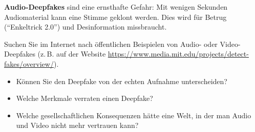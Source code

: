 \begin{myremark}
\textbf{Audio-Deepfakes} sind eine ernsthafte Gefahr: Mit wenigen Sekunden
Audiomaterial kann eine Stimme geklont werden. Dies wird für Betrug
(\enquote{Enkeltrick 2.0}) und Desinformation missbraucht.
\end{myremark}

\begin{myexercise}
Suchen Sie im Internet nach öffentlichen Beispielen von Audio- oder Video-Deepfakes
(z.\,B. auf der Website \url{https://www.media.mit.edu/projects/detect-fakes/overview/}).

\begin{itemize}
    \item Können Sie den Deepfake von der echten Aufnahme unterscheiden?
    \item Welche Merkmale verraten einen Deepfake?
    \item Welche gesellschaftlichen Konsequenzen hätte eine Welt, in der
          man Audio und Video nicht mehr vertrauen kann?
\end{itemize}
\end{myexercise}
